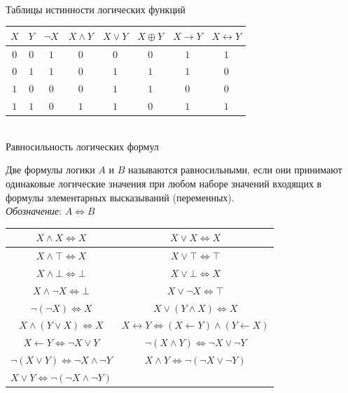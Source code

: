 \begin{frame}{\\ Таблицы истинности логических функций}
	\topline
	\justifying
	\vspace{5mm}
	\begin{center}
		\begin{tabular}{|c|c|c|c|c|c|c|c|}
			\hline
			$X$ & $Y$ & $\neg X$ & $X \land Y$ & $X \lor Y$ & $X \oplus Y$ & $X \to Y$ & $X \leftrightarrow Y$\\
			\hline
			$0$ & $0$ & $1$ & $0$ & $0$ & $0$ & $1$ & $1$\\
			\hline
			$0$ & $1$ & $1$ & $0$ & $1$ & $1$ & $1$ & $0$\\
			\hline
			$1$ & $0$ & $0$ & $0$ & $1$ & $1$ & $0$ & $0$\\
			\hline
			$1$ & $1$ & $0$ & $1$ & $1$ & $0$ & $1$ & $1$\\
			\hline
		\end{tabular}
	\end{center}
\end{frame}

\begin{frame}{\\Равносильность логических формул}
	\topline
	\\
	\footnotesize{
		Две формулы логики $A$ и $B$ называются равносильными, если они принимают одинаковые логические значения при любом наборе значений входящих в формулы элементарных высказываний (переменных).\\
		\textit{Обозначение}: $A \iff B$
		\begin{center}
			\begin{tabular}{|c|c|}
				\hline
				$X \land X \iff X$ & $X \lor X \iff X$\\
				\hline
				$X \land \top \iff X$ & $X \lor \top \iff \top$\\
				\hline
				$X \land \bot \iff \bot$ & $X \lor \bot \iff X$\\
				\hline
				$X \land \neg X \iff \bot$ & $X \lor \neg X \iff \top$\\
				\hline
				$\neg(\neg X) \iff X$ & $X \lor (Y \land X) \iff X$\\
				\hline
				$X \land (Y \lor X) \iff X$ & $X \leftrightarrow Y \iff (X \leftarrow Y) \land (Y \leftarrow X)$\\
				\hline
				$X \leftarrow Y \iff \neg X \lor Y$ & $\neg(X \land Y) \iff \neg X \lor \neg Y$\\
				\hline
				$\neg(X \lor Y) \iff \neg X \land \neg Y$ & $X \land Y \iff \neg(\neg X \lor \neg Y)$\\
				\hline
				$X \lor Y \iff \neg(\neg X \land \neg Y)$ &\\
				\hline
			\end{tabular}
		\end{center}
	}
\end{frame}

